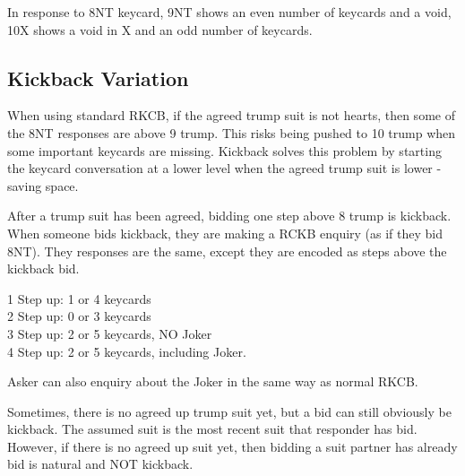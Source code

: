 \documentclass[a4paper]{report}
\theoremstyle{question}
\theoremstyle{theorem}
\theoremstyle{definition}
\newcommand{\<}{\left\langle}%
\renewcommand{\>}{\right\rangle}%
\begin{document}


In response to 8NT keycard, 9NT shows an even number of keycards and a void, 10X shows a void in X and an odd number of keycards.




\subsection*{Kickback Variation}

When using standard RKCB, if the agreed trump suit is not hearts, then some of the 8NT responses are above 9 trump. This risks being pushed to 10 trump when some important keycards are missing. Kickback solves this problem by starting the keycard conversation at a lower level when the agreed trump suit is lower - saving space. 

After a trump suit has been agreed, bidding one step above 8 trump is kickback. When someone bids kickback, they are making a RCKB enquiry (as if they bid 8NT). They responses are the same, except they are encoded as steps above the kickback bid.

1 Step up: 1 or 4 keycards\\
2 Step up: 0 or 3 keycards\\
3 Step up: 2 or 5 keycards, NO Joker\\ 
4 Step up: 2 or 5 keycards, including Joker.

Asker can also enquiry about the Joker in the same way as normal RKCB.

Sometimes, there is no agreed up trump suit yet, but a bid can still obviously be kickback. The assumed suit is the most recent suit that responder has bid. However, if there is no agreed up suit yet, then bidding a suit partner has already bid is natural  and NOT kickback.

\end{document}
